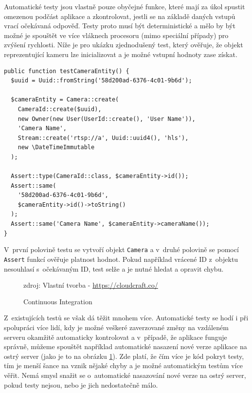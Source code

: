 Automatické testy jsou vlastně pouze obyčejné funkce, které mají za úkol spustit omezenou podčást aplikace a zkontrolovat, jestli se na základě daných vstupů vrací očekávaná odpověď. Testy proto musí být deterministické a mělo by být možné je spouštět ve více vláknech procesoru (mimo speciální případy) pro zvýšení rychlosti. Níže je pro ukázku zjednodušený test, který ověřuje, že objekt reprezentující kameru lze inicializovat a je možné vstupní hodnoty zase získat.

\begin{verbatim}
public function testCameraEntity() {
  $uuid = Uuid::fromString('58d200ad-6376-4c01-9b6d');

  $cameraEntity = Camera::create(
    CameraId::create($uuid),
    new Owner(new User(UserId::create(), 'User Name')),
    'Camera Name',
    Stream::create('rtsp://a', Uuid::uuid4(), 'hls'),
    new \DateTimeImmutable
  );

  Assert::type(CameraId::class, $cameraEntity->id());
  Assert::same(
    '58d200ad-6376-4c01-9b6d',
    $cameraEntity->id()->toString()
  );
  Assert::same('Camera Name', $cameraEntity->cameraName());
}
\end{verbatim}

V~první polovině testu se vytvoří objekt \texttt{Camera} a v~druhé polovině se pomocí \texttt{Assert} funkcí ověřuje platnost hodnot. Pokud například vrácené ID z~objektu nesouhlasí s~očekávaným ID, test selže a je nutné hledat a opravit chybu.

\begin{figure}[h]
	\centering
	\caption{Continuous Integration}
	\small zdroj: Vlastní tvorba - \url{https://cloudcraft.co/}
	\label{fig:ci}
\end{figure}

Z~existujících testů se však dá těžit mnohem více. Automatické testy se hodí i při spolupráci více lidí, kdy je možné veškeré zaverzované změny na vzdáleném serveru okamžitě automaticky kontrolovat a v~případě, že aplikace funguje správně, můžeme spouštět například automatické nasazení nové verze aplikace na ostrý server (jako je to na obrázku \ref{fig:ci}). Zde platí, že čím více je kód pokryt testy, tím je menší šance na vznik nějaké chyby a je možné automatickým testům více věřit. Nemá smysl snažit se o~automatické nasazování nové verze na ostrý server, pokud testy nejsou, nebo je jich nedostatečně málo.

